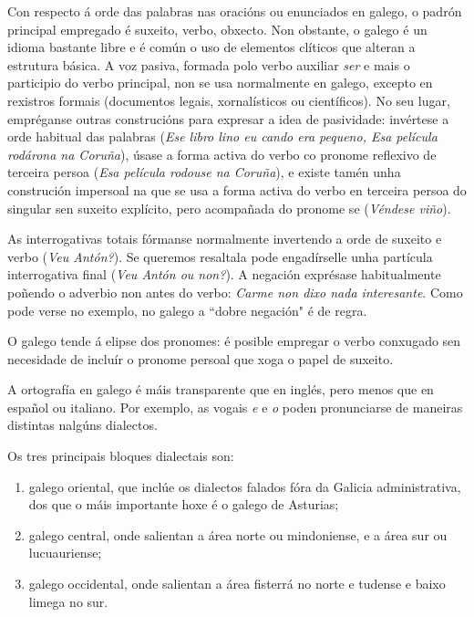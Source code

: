 \begin{multicols}{2}

Con respecto á orde das palabras nas oracións ou enunciados en galego, o padrón principal empregado é suxeito, verbo, obxecto. Non obstante, o galego é un idioma bastante libre e é común o uso de elementos clíticos que alteran a estrutura básica. A voz pasiva, formada polo verbo auxiliar \textit{ser} e mais o participio do verbo principal, non se usa normalmente en galego, excepto en rexistros formais (documentos legais, xornalísticos ou científicos). No seu lugar, empréganse outras construcións para expresar a idea de pasividade: invértese a orde habitual das palabras (\textit{Ese libro lino eu cando era pequeno, Esa película rodárona na Coruña}), úsase a forma activa do verbo co pronome reflexivo de terceira persoa (\textit{Esa película rodouse na Coruña}), e existe tamén unha construción impersoal na que se usa a forma activa do verbo en terceira persoa do singular sen suxeito explícito, pero acompañada do pronome se (\textit{Véndese viño}).
 
As interrogativas totais fórmanse normalmente invertendo a orde de suxeito e verbo (\textit{Veu Antón?}). Se queremos resaltala pode engadírselle unha partícula interrogativa final (\textit{Veu Antón ou non?}). A negación exprésase habitualmente poñendo o adverbio non antes do verbo: \textit{Carme non dixo nada interesante}. Como pode verse no exemplo, no galego a “dobre negación" é de regra.

O galego tende á elipse dos pronomes: é posible empregar o verbo conxugado sen necesidade de incluír o pronome persoal que xoga o papel de suxeito.

A ortografía en galego é máis transparente que en inglés, pero menos que en español ou italiano. Por exemplo, as vogais \textit{e} e \textit{o} poden pronunciarse de maneiras distintas nalgúns dialectos. 

Os tres principais bloques dialectais son:

\begin{enumerate}
\item galego oriental, que inclúe os dialectos falados fóra da Galicia administrativa, dos que o máis importante hoxe é o galego de Asturias;
\item galego central, onde salientan a área norte ou mindoniense, e a área sur ou lucuauriense;
\item galego occidental, onde salientan a área fisterrá no norte e tudense e baixo limega no sur. 
\end{enumerate}


\end{multicols}
